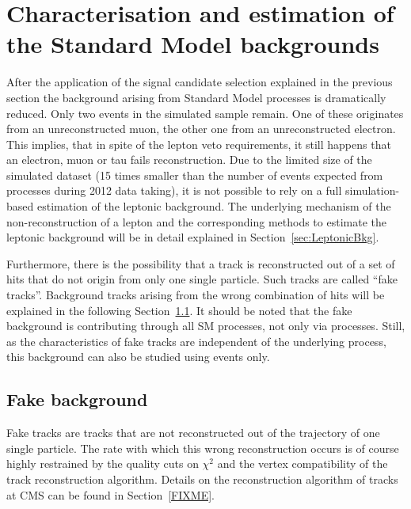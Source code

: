 \newpage
\chapter{Characterisation and estimation of the Standard Model backgrounds}
\label{sec:BackgroundEstimation}
After the application of the signal candidate selection explained in the previous section the background arising from Standard Model processes is dramatically reduced.
Only two events in the simulated \WJets sample remain.
One of these originates from an unreconstructed muon, the other one from an unreconstructed electron.
This implies, that in spite of the lepton veto requirements, it still happens that an electron, muon or tau fails reconstruction.
Due to the limited size of the simulated \WJets dataset (15 times smaller than the number of events expected from \WJets processes during 2012 data taking), 
it is not possible to rely on a full simulation-based estimation of the leptonic background.
The underlying mechanism of the non-reconstruction of a lepton and the corresponding methods to estimate the leptonic background will be in detail explained in Section~\ref{sec:LeptonicBkg}.

Furthermore, there is the possibility that a track is reconstructed out of a set of hits that do not origin from only one single particle.
Such tracks are called ``fake tracks''. 
Background tracks arising from the wrong combination of hits will be explained in the following Section~\ref{sec:FakeBkg}.
It should be noted that the fake background is contributing through all SM processes, not only via \WJets processes.
Still, as the characteristics of fake tracks are independent of the underlying process, this background can also be studied using \WJets events only.



\section{Fake background}
\label{sec:FakeBkg}
Fake tracks are tracks that are not reconstructed out of the trajectory of one single particle.
The rate with which this wrong reconstruction occurs is of course highly restrained by the quality cuts on $\chi^2$ and the vertex compatibility of the track reconstruction algorithm.
Details on the reconstruction algorithm of tracks at CMS can be found in Section~\ref{FIXME}.

